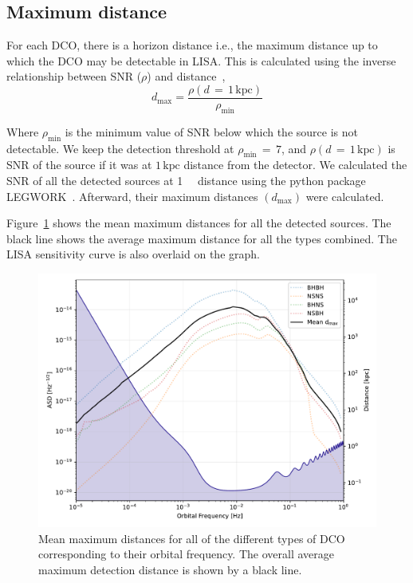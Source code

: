 \documentclass[journal, twocolumns]{IEEEtran}
\newcommand{\kpc}{\kilo\parsec}
\begin{document}
    \subsection{Maximum distance}\label{subsec:maximum-distance}
    For each DCO, there is a horizon distance i.e., the maximum distance up to which the DCO may be detectable in LISA. 
    This is calculated using the inverse relationship between SNR ($\rho$) and distance~\cite{Lau2020},
    \begin{equation}
        \label{eq:eq1}
        d_\text{max}=\frac{\rho(d\,=\,1\,\text{kpc})}{\rho_\text{min}}
    \end{equation}

    Where $\rho_{\min}$ is the minimum value of SNR below which the source is not detectable.
	We keep the detection threshold at $\rho_{\min}\,=\,7$, and $\rho(d\,=\,1\,\text{kpc})$ is SNR of the source if it was at $1\,\text{kpc}$ distance from the detector.
	We calculated the SNR of all the detected sources at \SI{1}{\kpc} distance using the python package LEGWORK~\cite{wagg2021legwork}.
	Afterward, their maximum distances $(d_{\max})$ were calculated.

    Figure~\ref{fig:dmax} shows the mean maximum distances for all the detected sources.
    The black line shows the average maximum distance for all the types combined.
    The LISA sensitivity curve is also overlaid on the graph.

	\begin{figure}[!h]
		\centering
        \includegraphics[width=\linewidth]{analysis_data/004__images_for_latex/d_max}
		\caption{Mean maximum distances for all of the different types of DCO corresponding to their orbital frequency. The overall average maximum detection distance is shown by a black line.}
		\label{fig:dmax}
	\end{figure}
\end{document}
